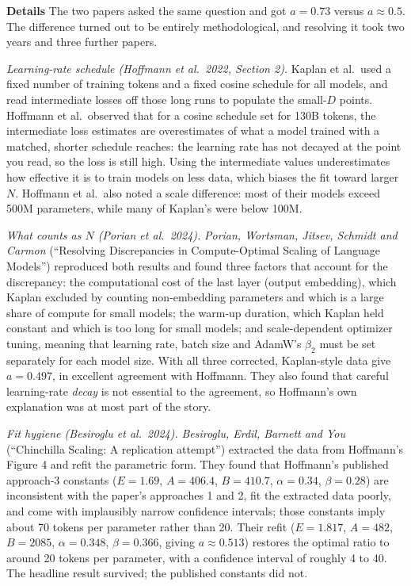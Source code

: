 \documentclass[11pt,letterpaper]{article}
\newcommand{\para}[1]{\medskip\noindent\textbf{#1}\quad}
\begin{document}
\para{Details} The two papers asked the same question and got $a=0.73$ versus $a\approx0.5$. The difference turned out to be entirely methodological, and resolving it took two years and three further papers.

\emph{Learning-rate schedule (Hoffmann et al.\ 2022, Section 2).} Kaplan et al.\ used a fixed number of training tokens and a fixed cosine schedule for all models, and read intermediate losses off those long runs to populate the small-$D$ points. Hoffmann et al.\ observed that for a cosine schedule set for 130B tokens, the intermediate loss estimates are overestimates of what a model trained with a matched, shorter schedule reaches: the learning rate has not decayed at the point you read, so the loss is still high. Using the intermediate values underestimates how effective it is to train models on less data, which biases the fit toward larger $N$. Hoffmann et al.\ also noted a scale difference: most of their models exceed 500M parameters, while many of Kaplan's were below 100M.

\emph{What counts as $N$ (Porian et al.\ 2024).} \emph{Porian, Wortsman, Jitsev, Schmidt and Carmon} (``Resolving Discrepancies in Compute-Optimal Scaling of Language Models'') reproduced both results and found three factors that account for the discrepancy: the computational cost of the last layer (output embedding), which Kaplan excluded by counting non-embedding parameters and which is a large share of compute for small models; the warm-up duration, which Kaplan held constant and which is too long for small models; and scale-dependent optimizer tuning, meaning that learning rate, batch size and AdamW's $\beta_2$ must be set separately for each model size. With all three corrected, Kaplan-style data give $a=0.497$, in excellent agreement with Hoffmann. They also found that careful learning-rate \emph{decay} is not essential to the agreement, so Hoffmann's own explanation was at most part of the story.

\emph{Fit hygiene (Besiroglu et al.\ 2024).} \emph{Besiroglu, Erdil, Barnett and You} (``Chinchilla Scaling: A replication attempt'') extracted the data from Hoffmann's Figure 4 and refit the parametric form. They found that Hoffmann's published approach-3 constants ($E=1.69$, $A=406.4$, $B=410.7$, $\alpha=0.34$, $\beta=0.28$) are inconsistent with the paper's approaches 1 and 2, fit the extracted data poorly, and come with implausibly narrow confidence intervals; those constants imply about 70 tokens per parameter rather than 20. Their refit ($E=1.817$, $A=482$, $B=2085$, $\alpha=0.348$, $\beta=0.366$, giving $a\approx0.513$) restores the optimal ratio to around 20 tokens per parameter, with a confidence interval of roughly 4 to 40. The headline result survived; the published constants did not.
\end{document}
